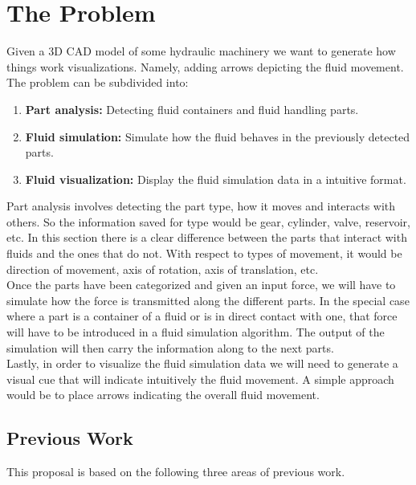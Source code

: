 \chapter{The Problem}
\label{sec:problem}

Given a 3D CAD model of some hydraulic machinery we want to generate how things work visualizations.
Namely, adding arrows depicting the fluid movement.\\

The problem can be subdivided into:
\begin{enumerate}
\item \textbf{Part analysis:} Detecting fluid containers and fluid handling parts.
\item \textbf{Fluid simulation:} Simulate how the fluid behaves in the previously detected parts.
\item \textbf{Fluid visualization:} Display the fluid simulation data in a intuitive format.\\
\end{enumerate}

Part analysis involves detecting the part type, how it moves and interacts with others.
So the information saved for type would be gear, cylinder, valve, reservoir, etc.
In this section there is a clear difference between the parts that interact with fluids and the ones that do not. 
With respect to types of movement, it would be direction of movement, axis of rotation, axis of translation, etc.\\

Once the parts have been categorized and given an input force, we will have to simulate how the force is transmitted along the different parts.
In the special case where a part is a container of a fluid or is in direct contact with one, that force will have to be introduced in a fluid simulation algorithm.
The output of the simulation will then carry the information along to the next parts.\\

Lastly, in order to visualize the fluid simulation data we will need to generate a visual cue that will indicate intuitively the fluid movement.
A simple approach would be to place arrows indicating the overall fluid movement.

\section{Previous Work}

This proposal is based on the following three areas of previous work.

